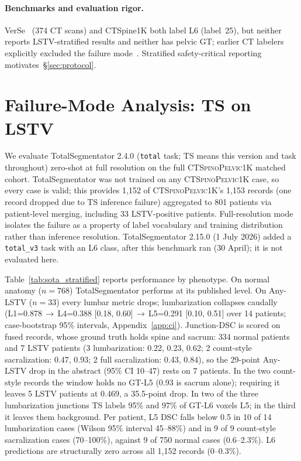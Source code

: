 \documentclass{article}
\newcommand{\dataset}{\textsc{CTSpinoPelvic1K}}
\newcommand{\TS}{TotalSegmentator}
\newcommand{\SOTA}{TotalSegmentator}
\newcommand{\sota}{TS}
\newcommand{\VerSe}{VerSe}
\begin{document}
\paragraph{Benchmarks and evaluation rigor.}
\VerSe{}~\citep{Sekuboyina2021VerSe:Images} (374 CT scans)
and CTSpine1K both label L6 (label~25), but neither
reports LSTV-stratified results and neither has pelvic GT; earlier CT labelers explicitly excluded
the failure mode~\citep{Sekuboyina2020LabelingAnatomy}.
Stratified safety-critical
reporting~\citep{Maier-Hein2024MetricsValidation}
motivates~\S\ref{sec:protocol}.

\section{Failure-Mode Analysis: \sota{} on LSTV}
\label{sec:audit}

We evaluate \SOTA{} 2.4.0 (\texttt{total} task; \sota{}
means this version and task throughout) zero-shot at
full resolution on the full \dataset{} matched cohort.
\SOTA{} was not trained on any \dataset{} case, so every
case is valid; this provides 1{,}152 of \dataset{}'s
1{,}153 records (one record dropped due to \sota{}
inference failure) aggregated to 801 patients via
patient-level merging, including 33 LSTV-positive
patients. Full-resolution mode isolates the failure as a
property of label vocabulary and training distribution
rather than inference resolution. \TS{} 2.15.0 (1 July
2026) added a \texttt{total\_v3} task with an L6 class,
after this benchmark ran (30 April); it is not
evaluated here.

Table~\ref{tab:sota_stratified} reports performance by
phenotype. On normal anatomy ($n{=}768$) \SOTA{} performs at
its published level. On Any-LSTV ($n{=}33$) every lumbar
metric drops; lumbarization collapses caudally
(L1=0.878\,$\to$\,L4=0.388 [0.18, 0.60]\,$\to$\,L5=0.291
[0.10, 0.51] over 14 patients; case-bootstrap 95\%
intervals, Appendix~\ref{app:ci}). Junction-DSC is scored on fused records, whose
ground truth holds spine and sacrum: 334 normal patients
and 7 LSTV patients (3 lumbarization: 0.22, 0.23, 0.62; 2
count-style sacralization: 0.47, 0.93; 2 full
sacralization: 0.43, 0.84), so the 29-point Any-LSTV drop
in the abstract (95\% CI 10--47) rests on 7 patients. In the two
count-style records the window holds no GT-L5 (0.93 is
sacrum alone); requiring it leaves 5 LSTV patients at
0.469, a 35.5-point drop. In two of the three
lumbarization junctions \sota{} labels 95\% and 97\% of
GT-L6 voxels L5; in the third it leaves them background.
Per patient, L5 DSC
falls below 0.5 in 10 of 14 lumbarization cases (Wilson
95\% interval 45--88\%) and in 9 of 9 count-style
sacralization cases (70--100\%), against 9 of 750 normal
cases (0.6--2.3\%). \textsc{L6} predictions are
structurally zero across all 1{,}152 records (0--0.3\%).
\end{document}
